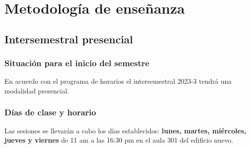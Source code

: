 \documentclass[12pt]{beamer}
\begin{document}
\section{Metodología de enseñanza}
\subsection{Intersemestral presencial}

\begin{frame}
\frametitle{Situación para el inicio del semestre}
En acuerdo con el programa de horarios el intersemestral 2023-3 tendrá una modalidad presencial.
\end{frame}
\begin{frame}
\frametitle{Días de clase y horario}
Las sesiones se llevarán a cabo los días establecidos: \textbf{lunes, martes, miércoles, jueves y viernes} de 11 am a las 16:30 pm en el aula 301 del edificio nuevo.
\end{frame}
\end{document}
